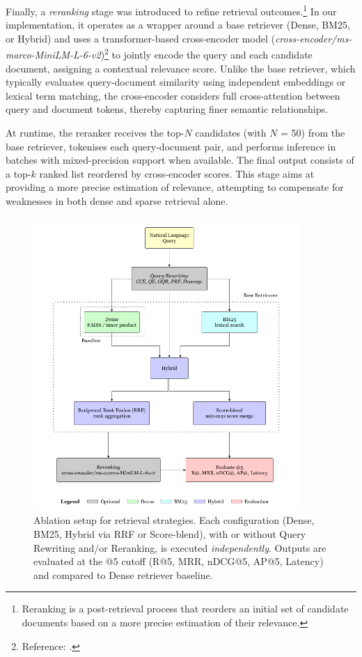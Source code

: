\begin{spacing}{1.5}
Finally, a \textit{reranking} stage was introduced to refine retrieval outcomes.\footnote{Reranking is a post-retrieval process that reorders an initial set of candidate documents based on a more precise estimation of their relevance.} In our implementation, it operates as a wrapper around a base retriever (Dense, BM25, or Hybrid) and uses a transformer-based cross-encoder model (\textit{cross-encoder/ms-marco-MiniLM-L-6-v2})\footnote{Reference: \textcite{noauthor_cross-encoderms-marco-minilm-l6-v2_2025}.} to jointly encode the query and each candidate document, assigning a contextual relevance score. Unlike the base retriever, which typically evaluates query-document similarity using independent embeddings or lexical term matching, the cross-encoder considers full cross-attention between query and document tokens, thereby capturing finer semantic relationships.

At runtime, the reranker receives the top-$N$ candidates (with $N$ = 50) from the base retriever, tokenises each query-document pair, and performs inference in batches with mixed-precision support when available. The final output consists of a top-$k$ ranked list reordered by cross-encoder scores. This stage aims at providing a more precise estimation of relevance, attempting to compensate for weaknesses in both dense and sparse retrieval alone.


\begin{figure}[H]
  \centering
  \includegraphics[width=0.9\textwidth]{images/evaluation_diagram.png} 
  \caption{Ablation setup for retrieval strategies. Each configuration (Dense, BM25, Hybrid via RRF or Score-blend), with or without Query Rewriting and/or Reranking, is executed \emph{independently}. Outputs are evaluated at the @5 cutoff (R@5, MRR, nDCG@5, AP@5, Latency) and compared to Dense retriever baseline.}
  \label{fig:ablation-setup}
\end{figure}




\end{spacing}
